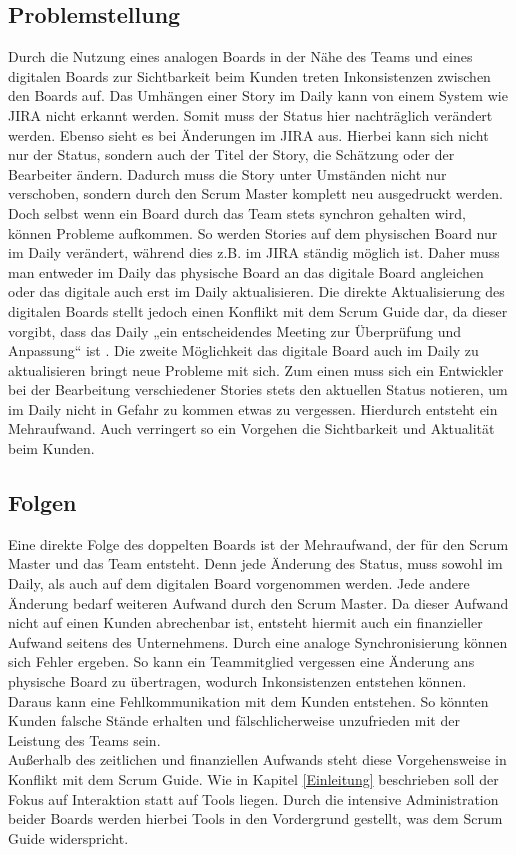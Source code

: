 \documentclass[12pt,titlepage]{scrartcl}
\begin{document}
		\subsection{Problemstellung} \label{Problemstellung}
		Durch die Nutzung eines analogen Boards in der Nähe des Teams und eines digitalen Boards zur Sichtbarkeit beim Kunden treten Inkonsistenzen zwischen den Boards auf. Das Umhängen einer Story im Daily kann von einem System wie JIRA nicht erkannt werden. Somit muss der Status hier nachträglich verändert werden. Ebenso sieht es bei Änderungen im JIRA aus. Hierbei kann sich nicht nur der Status, sondern auch der Titel der Story, die Schätzung oder der Bearbeiter ändern. Dadurch muss die Story unter Umständen nicht nur verschoben, sondern durch den Scrum Master komplett neu ausgedruckt werden. \\
		Doch selbst wenn ein Board durch das Team stets synchron gehalten wird, können Probleme aufkommen. So werden Stories auf dem physischen Board nur im Daily verändert, während dies z.B. im JIRA ständig möglich ist. Daher muss man entweder im Daily das physische Board an das digitale Board angleichen oder das digitale auch erst im Daily aktualisieren. Die direkte Aktualisierung des digitalen Boards stellt jedoch einen Konflikt mit dem Scrum Guide dar, da dieser vorgibt, dass das Daily „ein entscheidendes Meeting zur Überprüfung und Anpassung“ ist \cite{guide}. Die zweite Möglichkeit das digitale Board auch im Daily zu aktualisieren bringt neue Probleme mit sich. Zum einen muss sich ein Entwickler bei der Bearbeitung verschiedener Stories stets den aktuellen Status notieren, um im Daily nicht in Gefahr zu kommen etwas zu vergessen. Hierdurch entsteht ein Mehraufwand. Auch verringert so ein Vorgehen die Sichtbarkeit und Aktualität beim Kunden.		
		\subsection{Folgen}
		Eine direkte Folge des doppelten Boards ist der Mehraufwand, der für den Scrum Master und das Team entsteht. Denn jede Änderung des Status, muss sowohl im Daily, als auch auf dem digitalen Board vorgenommen werden. Jede andere Änderung bedarf weiteren Aufwand durch den Scrum Master. Da dieser Aufwand nicht auf einen Kunden abrechenbar ist, entsteht hiermit auch ein finanzieller Aufwand seitens des Unternehmens. Durch eine analoge Synchronisierung können sich Fehler ergeben. So kann ein Teammitglied vergessen eine Änderung ans physische Board zu übertragen, wodurch Inkonsistenzen entstehen können. Daraus kann eine Fehlkommunikation mit dem Kunden entstehen. So könnten Kunden falsche Stände erhalten und fälschlicherweise unzufrieden mit der Leistung des Teams sein. \\
		Außerhalb des zeitlichen und finanziellen Aufwands steht diese Vorgehensweise in Konflikt mit dem Scrum Guide. Wie in Kapitel \ref{Einleitung} beschrieben soll der Fokus auf Interaktion statt auf Tools liegen. Durch die intensive Administration beider Boards werden hierbei Tools in den Vordergrund gestellt, was dem Scrum Guide widerspricht.
\end{document}
